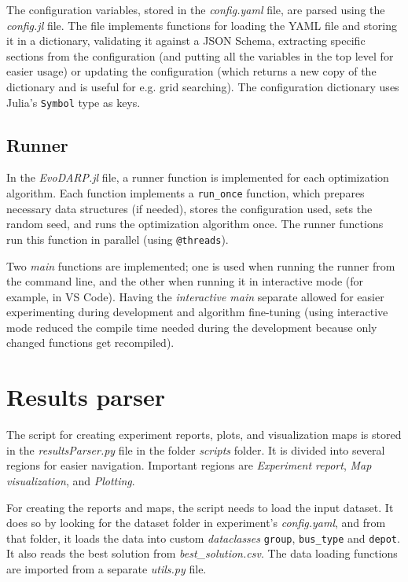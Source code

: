 The configuration variables, stored in the \textit{config.yaml} file, are parsed using the \textit{config.jl} file. The file implements functions for loading the YAML file and storing it in a dictionary, validating it against a JSON Schema, extracting specific sections from the configuration (and putting all the variables in the top level for easier usage) or updating the configuration (which returns a new copy of the dictionary and is useful for e.g. grid searching). The configuration dictionary uses Julia's \texttt{Symbol} type as keys.

\subsection{Runner}

In the \textit{EvoDARP.jl} file, a runner function is implemented for each optimization algorithm. Each function implements a \texttt{run\_once} function, which prepares necessary data structures (if needed), stores the configuration used, sets the random seed, and runs the optimization algorithm once. The runner functions run this function in parallel (using \texttt{@threads}).

Two \textit{main} functions are implemented; one is used when running the runner from the command line, and the other when running it in interactive mode (for example, in VS Code). Having the \textit{interactive main} separate allowed for easier experimenting during development and algorithm fine-tuning (using interactive mode reduced the compile time needed during the development because only changed functions get recompiled).

\section{Results parser}

The script for creating experiment reports, plots, and visualization maps is stored in the \textit{resultsParser.py} file in the folder \textit{scripts} folder. It is divided into several regions for easier navigation. Important regions are \textit{Experiment report}, \textit{Map visualization}, and \textit{Plotting}.

For creating the reports and maps, the script needs to load the input dataset. It does so by looking for the dataset folder in experiment's \textit{config.yaml}, and from that folder, it loads the data into custom \textit{dataclasses} \texttt{group}, \texttt{bus\_type} and \texttt{depot}. It also reads the best solution from \textit{best\_solution.csv}. The data loading functions are imported from a separate \textit{utils.py} file.

